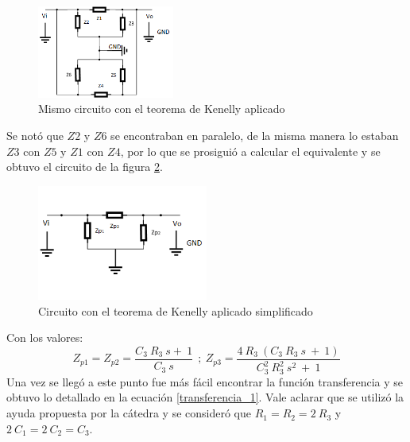 \begin{figure}[H]                                                       
    \centering\includegraphics[width=0.4\textwidth]{resources/circuitoconkenelly.png}
    \caption{Mismo circuito con el teorema de Kenelly aplicado}
    \label{circuitoconkenelly}
\end{figure}
Se notó que $Z2$ y $Z6$ se encontraban en paralelo, de la misma manera lo estaban $Z3$ con $Z5$ y $Z1$ con $Z4$, por lo que se prosiguió a calcular el equivalente y se obtuvo el circuito de la figura \ref{circuitoconkenellysimplificado}.

\begin{figure}[H]                                                       
    \centering\includegraphics[width=0.5\textwidth]{resources/circuitoconkenellysimplificado.png}
    \caption{Circuito con el teorema de Kenelly aplicado simplificado}
    \label{circuitoconkenellysimplificado}
\end{figure}

Con los valores:
\begin{equation}
Z_{p1}=Z_{p2}=\dfrac{C_3 \ R_3 \ s + \ 1}{C_3 \ s} \ \ ; \ Z_{p3}=\dfrac{4 \ R_3 \ (C_3 \ R_3 \ s \ + \ 1)}{C_3^2 \ R_3^2 \ s^2 \ + \ 1}
\end{equation}
Una vez se llegó a este punto fue más fácil encontrar la función transferencia y se obtuvo lo detallado en la ecuación \ref{transferencia_1}.
Vale aclarar que se utilizó la ayuda propuesta por la cátedra y se consideró que $R_{1} = R_{2}
= 2 \ R_{3}$ y $2 \ C_{1} = 2 \ C_{2} = C_{3}$.

